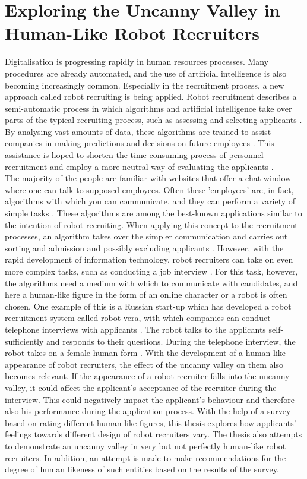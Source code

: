 \chapter{Exploring the Uncanny Valley in Human-Like Robot Recruiters}
Digitalisation is progressing rapidly in human resources processes. Many procedures are already automated, and the use of artificial intelligence is also becoming increasingly common. Especially in the recruitment process, a new approach called robot recruiting is being applied. Robot recruitment describes a semi-automatic process in which algorithms and artificial intelligence take over parts of the typical recruiting process, such as assessing and selecting applicants \cite{robot_recruiting}. By analysing vast amounts of data, these algorithms are trained to assist companies in making predictions and decisions on future employees \cite{robot_recruiting_scholar}. This assistance is hoped to shorten the time-consuming process of personnel recruitment and employ a more neutral way of evaluating the applicants \cite{robot_recruiting_scholar}.\\
The majority of the people are familiar with websites that offer a chat window where one can talk to supposed employees. Often these 'employees' are, in fact, algorithms with which you can communicate, and they can perform a variety of simple tasks \cite{robot_recruiting}. These algorithms are among the best-known applications similar to the intention of robot recruiting. When applying this concept to the recruitment processes, an algorithm takes over the simpler communication and carries out sorting and admission and possibly excluding applicants \cite{robot_recruiting}. However, with the rapid development of information technology, robot recruiters can take on even more complex tasks, such as conducting a job interview \cite{robot_recruiting}. For this task, however, the algorithms need a medium with which to communicate with candidates, and here a human-like figure in the form of an online character or a robot is often chosen. One example of this is a Russian start-up which has developed a robot recruitment system called robot vera, with which companies can conduct telephone interviews with applicants \cite{robot_recruiting}. The robot talks to the applicants self-sufficiently and responds to their questions. During the telephone interview, the robot takes on a female human form \cite{robot_recruiting}.\newpage
With the development of a human-like appearance of robot recruiters, the effect of the uncanny valley on them also becomes relevant. If the appearance of a robot recruiter falls into the uncanny valley, it could affect the applicant's acceptance of the recruiter during the interview. This could negatively impact the applicant's behaviour and therefore also his performance during the application process.
With the help of a survey based on rating different human-like figures, this thesis explores how applicants' feelings towards different design of robot recruiters vary. The thesis also attempts to demonstrate an uncanny valley in very but not perfectly human-like robot recruiters. In addition, an attempt is made to make recommendations for the degree of human likeness of such entities based on the results of the survey.  

